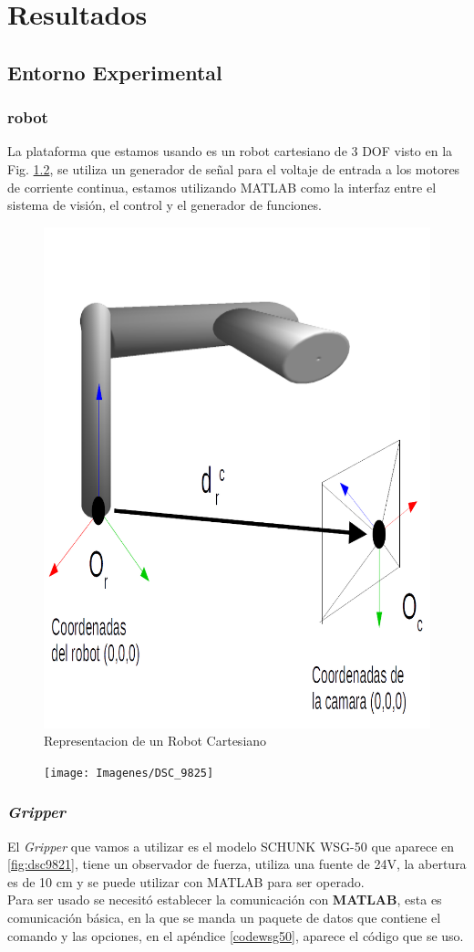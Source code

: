 \chapter{Resultados}

\section{Entorno Experimental}



\subsection{robot}
La plataforma que estamos usando es un robot cartesiano de 3 DOF visto en la Fig. \ref{fig:dsc9825}, se utiliza un generador de señal para el voltaje de entrada a los motores de corriente continua, estamos utilizando MATLAB como la interfaz entre el sistema de visión, el control y el generador de funciones.

\begin{figure}
	\centering
	\includegraphics[width=0.5\linewidth]{visio/visio3/coordenadasrobcam2}
	\caption{Representacion de un Robot Cartesiano}
	\label{fig:coordenadasrobcam}
\end{figure}


\begin{figure}
	\centering
	\texttt{[image: Imagenes/DSC\_9825]}
	\caption{}
	\label{fig:dsc9825}
\end{figure}



\subsection{\textit{Gripper}}
El \textit{Gripper} que vamos a utilizar es el modelo SCHUNK WSG-50 que aparece en \cref{fig:dsc9821}, tiene un observador de fuerza, utiliza una fuente de 24V, la abertura es de 10 cm y se puede utilizar con MATLAB para ser operado. \\
Para ser usado se necesitó establecer la comunicación con \textbf{MATLAB}, esta es comunicación básica, en la que se manda un paquete de datos que contiene el comando y las opciones, en el apéndice \ref{codewsg50}, aparece el código que se uso.

